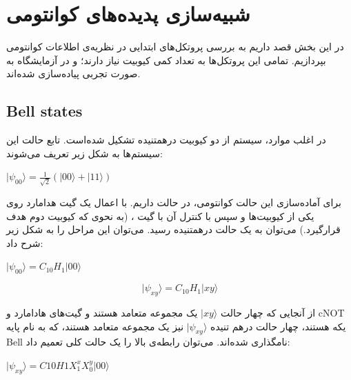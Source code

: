 \documentclass{book}
\begin{document}

\chapter{شبیه‌سازی پدیده‌های کوانتومی}
در این بخش قصد داریم به بررسی پروتکل‌های ابتدایی در نظریه‌ی اطلاعات کوانتومی بپردازیم. تمامی این پروتکل‌ها به تعداد کمی کیوبیت نیاز دارند؛ و در آزمایشگاه به صورت تجربی پیاده‌سازی شده‌اند. 
\section{Bell states}
در اغلب موارد، سیستم از دو کیوبیت درهمتنیده تشکیل شده‌است. تابع حالت این سیستم‌ها به شکل زیر تعریف می‌شوند:
\begin{center}
	$\vert \psi_{00} \rangle = \frac{1}{\sqrt{2}}(|00\rangle + |11\rangle)$
\end{center}
برای آماده‌سازی این حالت کوانتومی‌، در حالت  داریم. با اعمال یک گیت هدامارد روی یکی از کیوبیت‌ها و سپس با کنترل‌ آن با گیت ، (به نحوی که کیوبیت دوم هدف قرارگیرد.) می‌توان به یک حالت درهمتنیده رسید. می‌توان این مراحل را به شکل زیر شرح داد:
\begin{center}
	$\vert\psi_{00}\rangle = C_{10}H_{1}\vert00\rangle$
\end{center}

\[
\vert\psi_{xy}\rangle = C_{10}H_{1}\vert xy \rangle
\]

از آنجایی که چهار حالت $\vert xy\rangle$ یک مجموعه متعامد هستند و گیت‌های هادامارد و cNOT یکه هستند، چهار حالت درهم تنیده $\vert \psi_{xy}\rangle$ نیز یک مجموعه متعامد هستند، که به نام پایه Bell نامگذاری شده‌اند.  می‌توان رابطه‌ی بالا را یک حالت کلی تعمیم داد:

\begin{center}
$\vert \psi_{xy}\rangle = C10H1X^{x}_{1} X^{y}_{0} \vert00\rangle$\\
\end{center}
\end{document}

